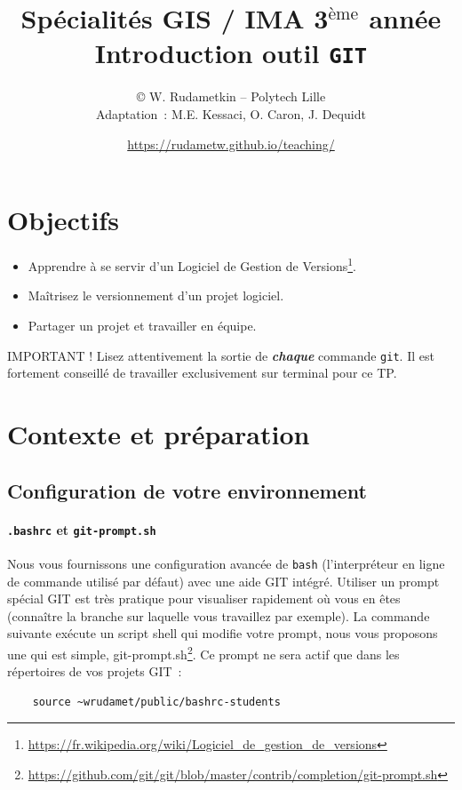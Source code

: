 \documentclass[final, a4paper, openbib, ]{article}
\title{Spécialités GIS / IMA 3$^{\mbox{\`eme}}$ année\\
\huge \textbf{Introduction outil \texttt{GIT}
}}
\author{\copyright{} W. Rudametkin -- Polytech Lille\\
	Adaptation~: M.E. Kessaci, O. Caron, J. Dequidt}
\date{\Large \url{https://rudametw.github.io/teaching/}}%
\begin{document}
\vspace{-5cm}
\posttitle{\par\end{center}}
\setlength{\droptitle}{-45pt}
\maketitle

\vspace{-1.2cm}
\section{Objectifs}\label{objectifs}

\begin{itemize}
\item Apprendre à se servir d'un Logiciel de Gestion de Versions\footnote{\url{https://fr.wikipedia.org/wiki/Logiciel_de_gestion_de_versions}}.
\item Maîtrisez le versionnement d'un projet logiciel.
\item Partager un projet et travailler en équipe.
\end{itemize}

\begin{alertinfo}{IMPORTANT !}
Lisez attentivement la sortie de \textbf{\textit{chaque}} commande \texttt{git}.
Il est fortement conseillé de travailler exclusivement sur terminal pour ce TP.
\end{alertinfo}

\section{Contexte et préparation}
\label{context} 

\subsection{Configuration de votre environnement}

\paragraph{\texttt{.bashrc} et \texttt{git-prompt.sh}}
Nous vous fournissons une configuration avancée de \texttt{bash} (l'interpréteur en ligne de commande utilisé par défaut) avec une aide GIT intégré.
Utiliser un prompt spécial GIT est très pratique pour visualiser rapidement où vous en êtes (connaître la branche sur laquelle vous travaillez par exemple). La commande suivante exécute un script shell qui modifie votre prompt, nous vous proposons une qui est simple, git-prompt.sh\footnote{\url{https://github.com/git/git/blob/master/contrib/completion/git-prompt.sh}}. Ce prompt ne sera actif que dans les répertoires de vos projets GIT~: 
\begin{verbatim}
	source ~wrudamet/public/bashrc-students
\end{verbatim}
\end{document}
